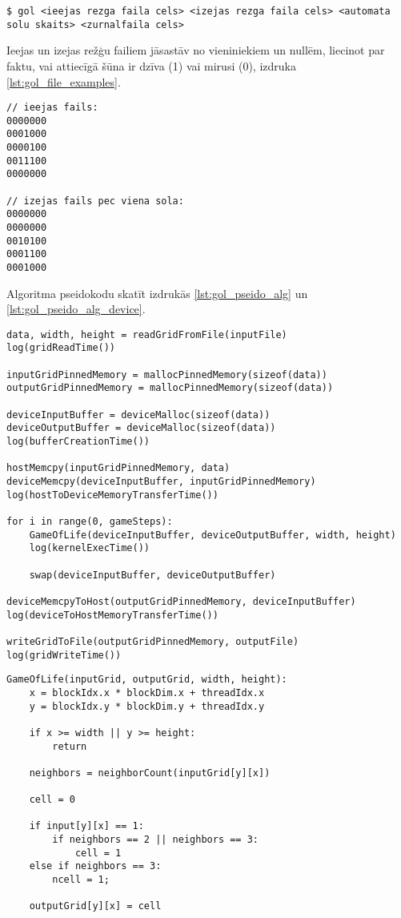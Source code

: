 \begin{lstlisting}[caption={Programmas galvenā izpilde},
    captionpos=b,
    label=lst:gol_mains]
$ gol <ieejas rezga faila cels> <izejas rezga faila cels> <automata solu skaits> <zurnalfaila cels> 
\end{lstlisting}

Ieejas un izejas režģu failiem jāsastāv no vieniniekiem un nullēm, liecinot par
faktu, vai attiecīgā šūna ir dzīva (1) vai mirusi (0), izdruka
\ref{lst:gol_file_examples}.

\begin{lstlisting}[caption={Ieejas, izejas faila piemērs (ar tā saukto planiera rakstu)},
    captionpos=b,
    label=lst:gol_file_examples]
// ieejas fails:
0000000
0001000
0000100
0011100
0000000

// izejas fails pec viena sola:
0000000
0000000
0010100
0001100
0001000
\end{lstlisting}

Algoritma pseidokodu skatīt izdrukās \ref{lst:gol_pseido_alg} un  \ref{lst:gol_pseido_alg_device}.
\begin{lstlisting}[caption={Dzīves spēles šūnu automāta CPU puses pseidokods},
    captionpos=b,
    label=lst:gol_pseido_alg]
data, width, height = readGridFromFile(inputFile)
log(gridReadTime())

inputGridPinnedMemory = mallocPinnedMemory(sizeof(data))
outputGridPinnedMemory = mallocPinnedMemory(sizeof(data))

deviceInputBuffer = deviceMalloc(sizeof(data))
deviceOutputBuffer = deviceMalloc(sizeof(data))
log(bufferCreationTime())

hostMemcpy(inputGridPinnedMemory, data)
deviceMemcpy(deviceInputBuffer, inputGridPinnedMemory)
log(hostToDeviceMemoryTransferTime())

for i in range(0, gameSteps):
    GameOfLife(deviceInputBuffer, deviceOutputBuffer, width, height)
    log(kernelExecTime())

    swap(deviceInputBuffer, deviceOutputBuffer)

deviceMemcpyToHost(outputGridPinnedMemory, deviceInputBuffer)
log(deviceToHostMemoryTransferTime())

writeGridToFile(outputGridPinnedMemory, outputFile)
log(gridWriteTime())
\end{lstlisting}

\begin{lstlisting}[caption={Dzīves spēles šūnu automāta GPGPU kodola pseidokods},
    captionpos=b,
    label=lst:gol_pseido_alg_device]
GameOfLife(inputGrid, outputGrid, width, height):
    x = blockIdx.x * blockDim.x + threadIdx.x
    y = blockIdx.y * blockDim.y + threadIdx.y

    if x >= width || y >= height:
        return

    neighbors = neighborCount(inputGrid[y][x])
    
    cell = 0

    if input[y][x] == 1:
		if neighbors == 2 || neighbors == 3:
		    cell = 1
	else if neighbors == 3:
        ncell = 1;

    outputGrid[y][x] = cell
\end{lstlisting}

